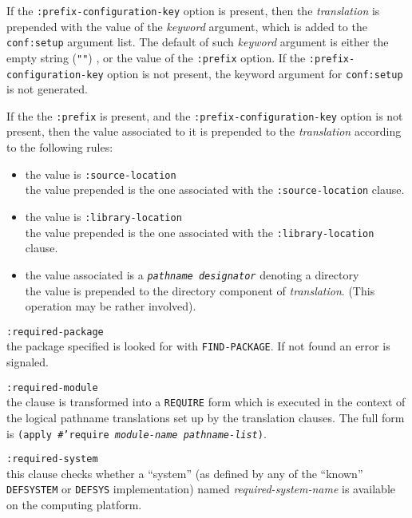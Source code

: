 \documentclass{article}
\newcommand{\notimpl}{\ddag}
\newcommand{\code}[1]{\texttt{#1}}
\newcommand{\clhsterm}[1]{\texttt{\textit{#1}}} %
\begin{document}
\begin{description}
	If the \code{:prefix-configuration-key} option is present,
	then the \emph{translation} is prepended with the value of the
	\emph{keyword} argument, which is added to the
	\code{conf:setup} argument list.  The default of such
	\emph{keyword} argument is either the empty string (\code{""})
	\notimpl, or the value of the \code{:prefix} option.
	If the \code{:prefix-configuration-key} option is not present,
	the keyword argument for \code{conf:setup} is not generated.

	If the the \code{:prefix} is present, and the
	\code{:prefix-configuration-key} option is not present, then
	the value associated to it is prepended to the
	\emph{translation} according to the following rules:
	\begin{itemize}
	\item	the value is \code{:source-location}\\
		the value prepended is the one associated with the
		\code{:source-location} clause.
	\item	the value is \code{:library-location}\\
		the value prepended is the one associated with the
		\code{:library-location} clause.
	\item	the value associated is a \clhsterm{pathname
		designator} denoting a directory\\
		the value is prepended to the directory component of
		\emph{translation}. (This operation may be rather involved).
	\end{itemize}

\item	\code{:required-package}\\
	the package specified is looked for with \code{FIND-PACKAGE}.
	If not found an error is signaled.

\item	\code{:required-module}\\
	the clause is transformed into a \code{REQUIRE} form which is
	executed in the context of the logical pathname translations
	set up by the translation clauses.  The full form is
	\code{(apply \#'require \emph{module-name} \emph{pathname-list})}.
	
\item	\code{:required-system}\\
	this clause checks whether a ``system'' (as defined by any of
	the ``known'' \code{DEFSYSTEM} or \code{DEFSYS}
	implementation) named \emph{required-system-name} is
	available on the computing platform.


\end{description}
\end{document}
